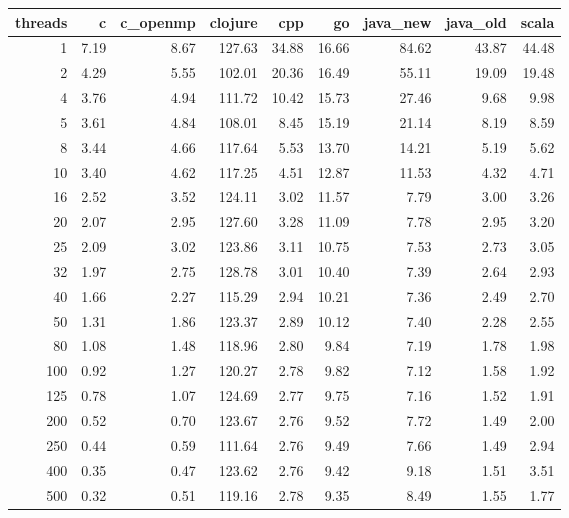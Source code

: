 \begin{table}[ht]
\centering
\begin{tabular}{rrrrrrrrr}
  \hline
threads & c & c\_openmp & clojure & cpp & go & java\_new & java\_old & scala \\ 
  \hline
  1 & 7.19 & 8.67 & 127.63 & 34.88 & 16.66 & 84.62 & 43.87 & 44.48 \\ 
    2 & 4.29 & 5.55 & 102.01 & 20.36 & 16.49 & 55.11 & 19.09 & 19.48 \\ 
    4 & 3.76 & 4.94 & 111.72 & 10.42 & 15.73 & 27.46 & 9.68 & 9.98 \\ 
    5 & 3.61 & 4.84 & 108.01 & 8.45 & 15.19 & 21.14 & 8.19 & 8.59 \\ 
    8 & 3.44 & 4.66 & 117.64 & 5.53 & 13.70 & 14.21 & 5.19 & 5.62 \\ 
   10 & 3.40 & 4.62 & 117.25 & 4.51 & 12.87 & 11.53 & 4.32 & 4.71 \\ 
   16 & 2.52 & 3.52 & 124.11 & 3.02 & 11.57 & 7.79 & 3.00 & 3.26 \\ 
   20 & 2.07 & 2.95 & 127.60 & 3.28 & 11.09 & 7.78 & 2.95 & 3.20 \\ 
   25 & 2.09 & 3.02 & 123.86 & 3.11 & 10.75 & 7.53 & 2.73 & 3.05 \\ 
   32 & 1.97 & 2.75 & 128.78 & 3.01 & 10.40 & 7.39 & 2.64 & 2.93 \\ 
   40 & 1.66 & 2.27 & 115.29 & 2.94 & 10.21 & 7.36 & 2.49 & 2.70 \\ 
   50 & 1.31 & 1.86 & 123.37 & 2.89 & 10.12 & 7.40 & 2.28 & 2.55 \\ 
   80 & 1.08 & 1.48 & 118.96 & 2.80 & 9.84 & 7.19 & 1.78 & 1.98 \\ 
  100 & 0.92 & 1.27 & 120.27 & 2.78 & 9.82 & 7.12 & 1.58 & 1.92 \\ 
  125 & 0.78 & 1.07 & 124.69 & 2.77 & 9.75 & 7.16 & 1.52 & 1.91 \\ 
  200 & 0.52 & 0.70 & 123.67 & 2.76 & 9.52 & 7.72 & 1.49 & 2.00 \\ 
  250 & 0.44 & 0.59 & 111.64 & 2.76 & 9.49 & 7.66 & 1.49 & 2.94 \\ 
  400 & 0.35 & 0.47 & 123.62 & 2.76 & 9.42 & 9.18 & 1.51 & 3.51 \\ 
  500 & 0.32 & 0.51 & 119.16 & 2.78 & 9.35 & 8.49 & 1.55 & 1.77 \\ 
   \hline
\end{tabular}
\end{table}
